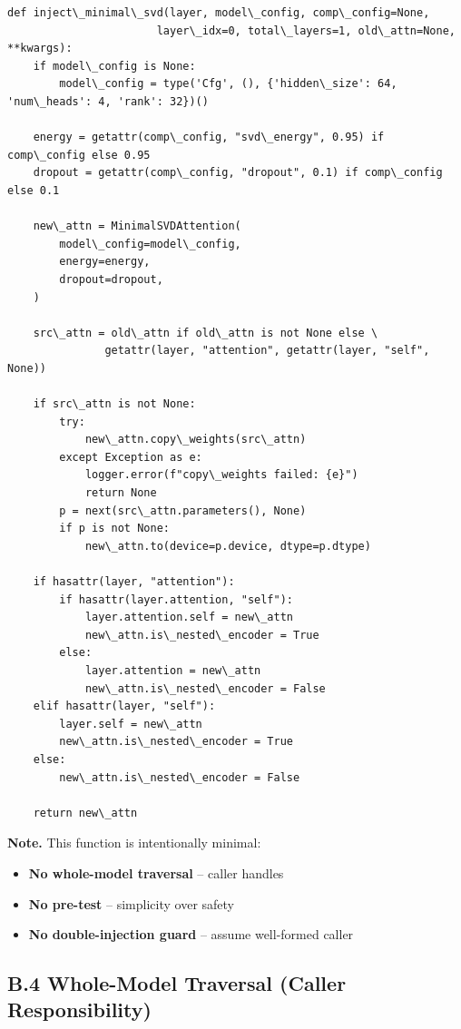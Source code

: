 \begin{lstlisting}
def inject\_minimal\_svd(layer, model\_config, comp\_config=None,
                       layer\_idx=0, total\_layers=1, old\_attn=None, **kwargs):
    if model\_config is None:
        model\_config = type('Cfg', (), {'hidden\_size': 64, 'num\_heads': 4, 'rank': 32})()
    
    energy = getattr(comp\_config, "svd\_energy", 0.95) if comp\_config else 0.95
    dropout = getattr(comp\_config, "dropout", 0.1) if comp\_config else 0.1
    
    new\_attn = MinimalSVDAttention(
        model\_config=model\_config,
        energy=energy,
        dropout=dropout,
    )
    
    src\_attn = old\_attn if old\_attn is not None else \
               getattr(layer, "attention", getattr(layer, "self", None))
    
    if src\_attn is not None:
        try:
            new\_attn.copy\_weights(src\_attn)
        except Exception as e:
            logger.error(f"copy\_weights failed: {e}")
            return None
        p = next(src\_attn.parameters(), None)
        if p is not None:
            new\_attn.to(device=p.device, dtype=p.dtype)
    
    if hasattr(layer, "attention"):
        if hasattr(layer.attention, "self"):
            layer.attention.self = new\_attn
            new\_attn.is\_nested\_encoder = True
        else:
            layer.attention = new\_attn
            new\_attn.is\_nested\_encoder = False
    elif hasattr(layer, "self"):
        layer.self = new\_attn
        new\_attn.is\_nested\_encoder = True
    else:
        new\_attn.is\_nested\_encoder = False
    
    return new\_attn
\end{lstlisting}

\textbf{Note.} This function is intentionally minimal:

\begin{itemize}
\item \textbf{No whole-model traversal} -- caller handles
\item \textbf{No pre-test} -- simplicity over safety
\item \textbf{No double-injection guard} -- assume well-formed caller

\end{itemize}
\subsection{B.4 Whole-Model Traversal (Caller Responsibility)}

